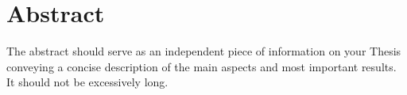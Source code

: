 
\chapter{Abstract}

The abstract should serve as an independent piece of information on your Thesis conveying a concise description of the main aspects and most important results.
It should not be excessively long.